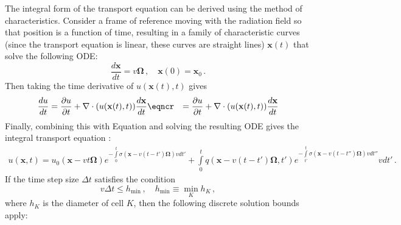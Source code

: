 \documentclass[xchauthor,chkrefs,fixeqskip,GCNS,amsmath,amsthm]{yjcphg}
\theoremstyle{remark}
\newcommand{\di}{\bm{\Omega}}
\begin{document}
The integral form of the transport equation can be derived using the
method of characteristics. Consider a frame of reference moving with the
radiation field so that position is a function of time, resulting in a
family of characteristic curves (since the transport equation is linear,
these curves are straight lines) $\mathbf{x}(t)$ that solve the
following ODE:
%
\begin{equation}
\frac{d\mathbf{x}}{dt}=v\di\,,\quad\mathbf{x}(0)=\mathbf{x}_{0}\,.
\end{equation}
%
Then taking the time derivative of $u(\mathbf{x}(t),t)$ gives
%
\begin{align}
\frac{du}{dt}
& = \frac{\partial u}{\partial t} + \nabla\cdot(u(
\mathbf{x}(t),t))\frac{d\mathbf{x}}{dt}
\eqncr
& = \frac{\partial u}{\partial t} + \nabla\cdot(u(\mathbf
{x}(t),t))\frac{d
\mathbf{x}}{dt}
\end{align}
%
Finally, combining this with Equation  and
solving the resulting ODE gives the integral transport equation
\cite{glasstone}:
%
\begin{eqnarray}
\label{eq:integral_transport}
u(\mathbf{x},t) = u_{0}(\mathbf{x}- v t\di) e^{-\int\limits_{0}^{t}
\sigma(\mathbf{x}- v(t -t')\di)v dt'}
+ \int\limits_{0}^{t} q(\mathbf{x}- v(t -t')\di,t') e^{-\int
\limits
_{t'}^{t}
\sigma(\mathbf{x}- v(t -{t''})\di)v d{t''}} v dt' \,.
\end{eqnarray}
%
If the time step size $\Delta t$ satisfies the condition
%
\begin{equation}
\label{eq:cfl_analytic_dmp}
v\Delta t\leq h_{\min} \,,\quad h_{\min} \equiv\min\limits_{K} h
_{K} \,,
\end{equation}
%
where $h_{K}$ is the diameter of cell $K$, then the following discrete
solution bounds apply:
%
\end{document}
